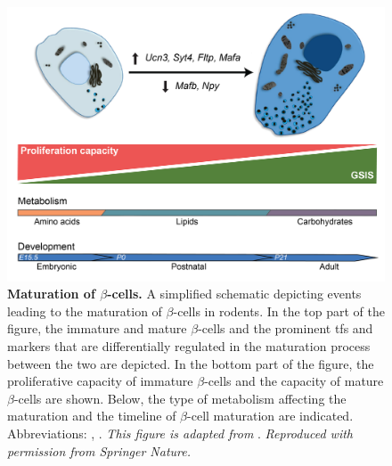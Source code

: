 \begin{figure}[t]
    \centering
    \includegraphics[width=12cm]{Chapter1/Fig/F1-16-01.png}
    \caption[Maturation of $\beta$-cells]{\textbf{Maturation of $\beta$-cells.} A simplified schematic depicting events leading to the maturation of $\beta$-cells in rodents. In the top part of the figure, the immature and mature $\beta$-cells and the prominent \glspl{tf} and markers that are differentially regulated in the maturation process between the two are depicted. In the bottom part of the figure, the proliferative capacity of immature $\beta$-cells and the  capacity of mature $\beta$-cells are shown. Below, the type of metabolism affecting the maturation and the timeline of $\beta$-cell maturation are indicated. Abbreviations: , . \textit{This figure is adapted from }\textbf{\cite{salinno_-cell_2019}}. \textit{Reproduced with permission from Springer Nature.}}
    \label{fig:chp1_betamat}
\end{figure}

